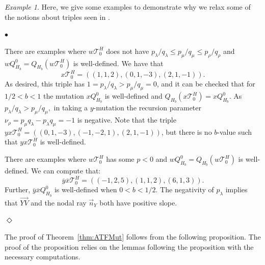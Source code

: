 \documentclass[11pt, reqno]{amsart}
\theoremstyle{remark}
\numberwithin{equation}{subsection}
\numberwithin{figure}{section}
\theoremstyle{customremark}
\newtheorem{example_no_diamond}[thm]{Example}
\newenvironment{example}{\begin{example_no_diamond} } {\hfill$\er$ \end{example_no_diamond}}
\newcommand{\Tt}{\mathcal{T}}
\newenvironment{itemlist}
   { \begin{list} {$\bullet$}
         { \setlength{\topsep}{.5ex}  \setlength{\itemsep}{.5ex} \setlength{\leftmargin}{2.5ex} } }
   { \end{list} }
\newcommand{\vn}{{\vec{n}}}
\newcommand{\ovr}{\overrightarrow}
\newcommand{\ov}{\overline}
\newcommand{\la}{{\lambda}}
\newcommand{\er}{{\Diamond}}
\begin{document}
\begin{example} \label{ex:unusualTrip}
Here, we give some examples to demonstrate why we relax some of the notions about triples seen in \cite{MMW}.  
\begin{itemlist}
    \item[{(i)}] There are examples where $w\Tt_0^H$ does not have $p_\la/q_\la \leq p_\mu/q_\mu \leq p_\rho/q_\rho$ and $wQ_{H_b}^0=Q_{H_b}(w\Tt_0^H)$ is well-defined. 
    We have that 
    \[x\Tt_0^H=\left((1,1,2),(0,1,-3),(2,1,-1)\right).\] As desired, this triple has $1=p_\la/q_\la > p_\mu/q_\mu=0$, and it can be checked that for $1/2<b<1$ the mutation $xQ_{H_b}^0$ is well-defined and $Q_{H_b}(x\Tt_0^H)=xQ_{H_b}^0.$
As $p_\la/q_\la>p_\mu/q_\mu,$ in taking a $y$-mutation
 the recursion parameter $\nu_\rho=p_\mu q_\la-p_\la q_\mu=-1$ is negative. Note that the triple $yx\Tt_0^H=((0,1,-3),(-1,-2,1),(2,1,-1))$, but there is no $b$-value such that $yx\Tt_0^H$ is well-defined.
    \item[{(ii)}] There are examples where $w\Tt_0^H$ has some $p<0$ and $wQ_{H_b}^0=Q_{H_b}(w\Tt_0^H)$ is well-defined.
    We can compute that: 
    \[ \ov{y}\ov{x}\Tt_0^H=\left((-1,2,5),(1,1,2),(6,1,3)\right).\]
    Further, $\ov{y}\ov{x}Q_{H_b}^0$ is well-defined when $0<b<1/2.$
   The negativity of $p_\la$ implies that $\ovr{YV}$ and the nodal ray $\vn_Y$ both have positive slope. 
\end{itemlist}
\end{example}


The proof of Theorem~\ref{thm:ATFMut} follows from the following proposition. The proof of the proposition relies on the lemmas following the proposition with the necessary computations. 
\end{document}
